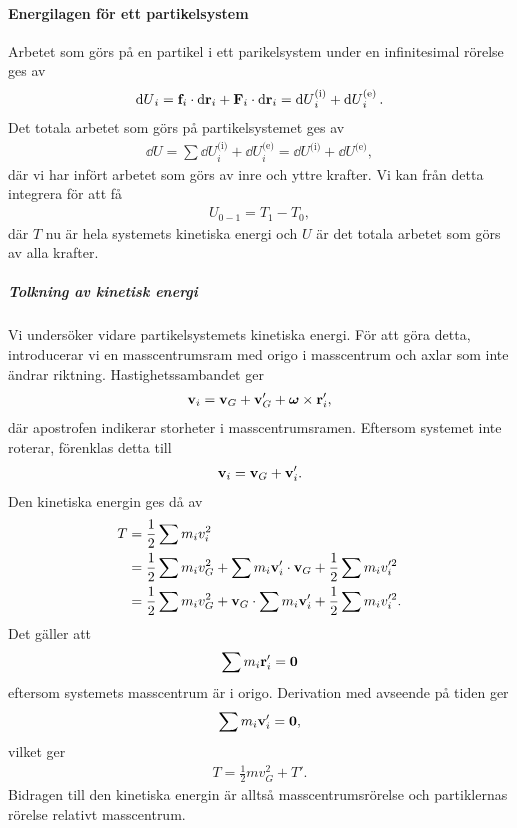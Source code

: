 \paragraph{Energilagen för ett partikelsystem}
Arbetet som görs på en partikel i ett parikelsystem under en infinitesimal rörelse ges av
\begin{align*}
	\dd{U}_{i} = \vb{f}_{i}\cdot\dd{\vb{r}_i} + \vb{F}_{i}\cdot\dd{\vb{r}_i} = \dd{U}_{i}^{\text{(i)}} + \dd{U}_{i}^{\text{(e)}}.
\end{align*}
Det totala arbetet som görs på partikelsystemet ges av
\begin{align*}
	\dd{U} = \sum \dd{U}_{i}^{\text{(i)}} + \dd{U}_{i}^{\text{(e)}} = \dd{U}^{\text{(i)}} + \dd{U}^{\text{(e)}},
\end{align*}
där vi har infört arbetet som görs av inre och yttre krafter. Vi kan från detta integrera för att få
\begin{align*}
	U_{0 - 1} = T_{1} - T_{0},
\end{align*}
där $T$ nu är hela systemets kinetiska energi och $U$ är det totala arbetet som görs av alla krafter.

\subparagraph{Tolkning av kinetisk energi}
Vi undersöker vidare partikelsystemets kinetiska energi. För att göra detta, introducerar vi en masscentrumsram med origo i masscentrum och axlar som inte ändrar riktning. Hastighetssambandet ger
\begin{align*}
	\vb{v}_{i} = \vb{v}_{G} + \vb{v}_{G}' + \vb*{\omega}\times\vb{r}_{i}',
\end{align*}
där apostrofen indikerar storheter i masscentrumsramen. Eftersom systemet inte roterar, förenklas detta till
\begin{align*}
	\vb{v}_{i} = \vb{v}_{G} + \vb{v}_{i}'.
\end{align*}
Den kinetiska energin ges då av
\begin{align*}
	T &= \frac{1}{2}\sum m_{i}v_{i}^2 \\
	  &= \frac{1}{2}\sum m_{i}v_{G}^2 + \sum m_{i}\vb{v}_{i}'\cdot\vb{v}_{G} + \frac{1}{2}\sum m_{i}v_{i}'^2 \\
	  &= \frac{1}{2}\sum m_{i}v_{G}^2 + \vb{v}_{G}\cdot\sum m_{i}\vb{v}_{i}' + \frac{1}{2}\sum m_{i}v_{i}'^2.
\end{align*}
Det gäller att
\begin{align*}
	\sum m_{i}\vb{r}_{i}' = \vb{0}
\end{align*}
eftersom systemets masscentrum är i origo. Derivation med avseende på tiden ger
\begin{align*}
	\sum m_{i}\vb{v}_{i}' = \vb{0},
\end{align*}
vilket ger
\begin{align*}
	T = \frac{1}{2}mv_{G}^2 + T'.
\end{align*}
Bidragen till den kinetiska energin är alltså masscentrumsrörelse och partiklernas rörelse relativt masscentrum.

